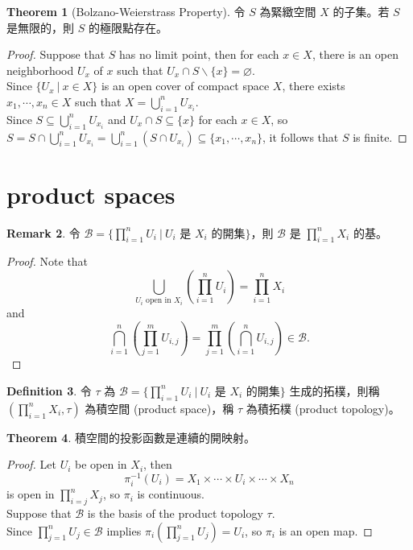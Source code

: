 \documentclass[12pt]{article}
\theoremstyle{definition}
\newtheorem{definition}{Definition}[section]
\newtheorem{theorem}[definition]{Theorem}
\newtheorem{remark}[definition]{Remark}
\newcommand\<{\langle}
\renewcommand\>{\rangle}
\begin{document}
\begin{CJK}{UTF8}{bsmi}
\begin{theorem}[Bolzano-Weierstrass Property]
    令 $S$ 為緊緻空間 $X$ 的子集。若 $S$ 是無限的，則 $S$ 的極限點存在。
\end{theorem}
\begin{proof}
    Suppose that $S$ has no limit point, then for each $x\in X$, there is an open neighborhood $U_x$ of $x$ such that $U_x\cap S\backslash\{x\}=\varnothing$. \\
    Since $\{U_x\ |\ x\in X\}$ is an open cover of compact space $X$, there exists $x_1, \cdots, x_n\in X$ such that $X=\bigcup_{i=1}^n U_{x_i}$. \\
    Since $S\subseteq\bigcup_{i=1}^n U_{x_i}$ and $U_x\cap S\subseteq\{x\}$ for each $x\in X$, so $S=S\cap\bigcup_{i=1}^n U_{x_i}=\bigcup_{i=1}^n (S\cap U_{x_i})\subseteq\{x_1, \cdots, x_n\}$, it follows that $S$ is finite.
\end{proof}

\section{product spaces}

\begin{remark}
    令 $\mathcal{B}=\{\prod_{i=1}^n U_i\ |\ U_i\text{ 是 }X_i\text{ 的開集}\}$，則 $\mathcal{B}$ 是 $\prod_{i=1}^n X_i$ 的基。
\end{remark}
\begin{proof}
    Note that
    \[
        \bigcup_{U_i\text{ open in }X_i}\left(\prod_{i=1}^n U_i\right)
        = \prod_{i=1}^n X_i
    \]
    and
    \[
        \bigcap_{i=1}^n\left(\prod_{j=1}^m U_{i, j}\right)
        =\prod_{j=1}^m\left(\bigcap_{i=1}^n U_{i, j}\right)
        \in\mathcal{B}.
    \]
\end{proof}

\begin{definition}
    令 $\tau$ 為 $\mathcal{B}=\{\prod_{i=1}^n U_i\ |\ U_i\text{ 是 }X_i\text{ 的開集}\}$ 生成的拓樸，則稱 $(\prod_{i=1}^n X_i, \tau)$ 為積空間 (product space)，稱 $\tau$ 為積拓樸 (product topology)。
\end{definition}

\begin{theorem}
    積空間的投影函數是連續的開映射。
\end{theorem}
\begin{proof}
    Let $U_i$ be open in $X_i$, then 
    \[
        \pi_i^{-1}(U_i)
        = X_1\times\cdots \times U_i\times\cdots\times X_n
    \]
    is open in $\prod_{i=j}^n X_j$, so $\pi_i$ is continuous. \\
    Suppose that $\mathcal{B}$ is the basis of the product topology $\tau$. \\
    Since $\prod_{j=1}^n U_j\in\mathcal{B}$ implies $\pi_i(\prod_{j=1}^n U_j)=U_i$, so $\pi_i$ is an open map.
\end{proof}


\end{CJK}
\end{document}
